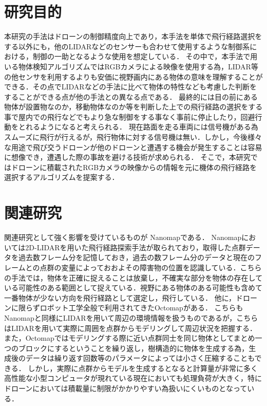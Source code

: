 \documentclass[a4j,10pt]{jsarticle}
\begin{document}
\section{研究目的}
本研究の手法はドローンの制御精度向上であり，本手法を単体で飛行経路選択をする以外にも，他のLIDARなどのセンサーも合わせて使用するような制御系における，制御の一助となるような使用を想定している．
その中で，本手法で用いる物体検知アルゴリズムではRGBカメラによる映像を使用する為，LIDAR等の他センサを利用するよりも安価に視野画内にある物体の意味を理解することができる．その点でLIDARなどの手法に比べて物体の特性なども考慮した判断をすることができる点が他の手法との異なる点である．
最終的には目の前にある物体が設置物なのか，移動物体なのか等を判断した上での飛行経路の選択をする事で屋内での飛行などでもより急な制御をする事なく事前に停止したり，回避行動をとれるようになると考えられる．
現在路面を走る車両には信号機がある為スムーズに飛行が行えるが，飛行物体に対する信号機は無い．しかし，今後様々な用途で飛び交うドローンが他のドローンと遭遇する機会が発生することは容易に想像でき，遭遇した際の事故を避ける技術が求められる．
そこで，本研究ではドローンに積載されたRGBカメラの映像からの情報を元に機体の飛行経路を選択するアルゴリズムを提案する．

\section{関連研究}
関連研究として強く影響を受けているものが Nanomap\cite{Nanomap}である．
Nanomapにおいては2D-LIDARを用いた飛行経路探索手法が取られており，取得した点群データを過去数フレーム分を記憶しておき，過去の数フレーム分のデータと現在のフレームとの点群の変量によっておおよその障害物の位置を認識している．こちらの手法では，物体を正確に捉えることは放棄し，不確実な部分を物体の存在している可能性のある範囲として捉えている．視野にある物体のある可能性も含めて一番物体が少ない方向を飛行経路として選定し，飛行している．
他に，ドローンに限らずロボット工学全般で利用されてきたOctomap\cite{Octomap}がある．
こちらもNanomapと同様にLIDARを用いて周辺の環境情報を扱うものであるが，こちらはLIDARを用いて実際に周囲を点群からモデリングして周辺状況を把握する．
また，Octomapではモデリングする際に近い点群同士を同じ物体としてまとめ一つのブロックにするということを繰り返し，樹構造的に物体を生成する為，生成後のデータは繰り返す回数等のパラメータによっては小さく圧縮することもできる．
しかし，実際に点群からモデルを生成するとなると計算量が非常に多く高性能な小型コンピュータが現れている現在においても処理負荷が大きく，特にドローンにおいては積載量に制限がかかりやすい為扱いにくいものとなっている．
\end{document}
